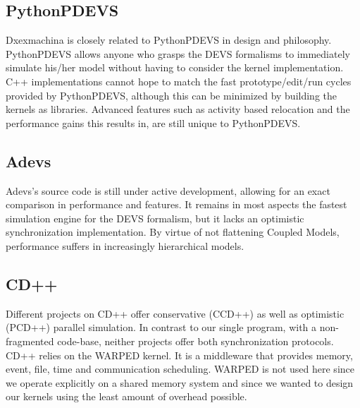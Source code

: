 \subsection{PythonPDEVS}
Dxexmachina is closely related to PythonPDEVS in design and philosophy. PythonPDEVS allows anyone who grasps the DEVS formalisms to immediately simulate his/her model without having to consider the kernel implementation. C++ implementations cannot hope to match the fast prototype/edit/run cycles provided by PythonPDEVS, although this can be minimized by building the kernels as libraries. %
Advanced features such as activity based relocation and the performance gains this results in, are still unique to PythonPDEVS. \\
\subsection{Adevs}
Adevs's source code is still under active development, allowing for an exact comparison in performance and features. It remains in most aspects the fastest simulation engine for the DEVS formalism, but it lacks an optimistic synchronization implementation. %
By virtue of not flattening Coupled Models, performance suffers in increasingly hierarchical models.
\subsection{CD++}
Different projects on CD++ offer conservative (CCD++) as well as optimistic (PCD++) parallel simulation. In contrast to our single program, with a non-fragmented code-base, neither projects offer both synchronization protocols. CD++ relies on the WARPED kernel. It is a middleware that provides memory, event, file, time and communication scheduling. WARPED is not used here since we operate explicitly on a shared memory system and since we wanted to design our kernels using the least amount of overhead possible.
